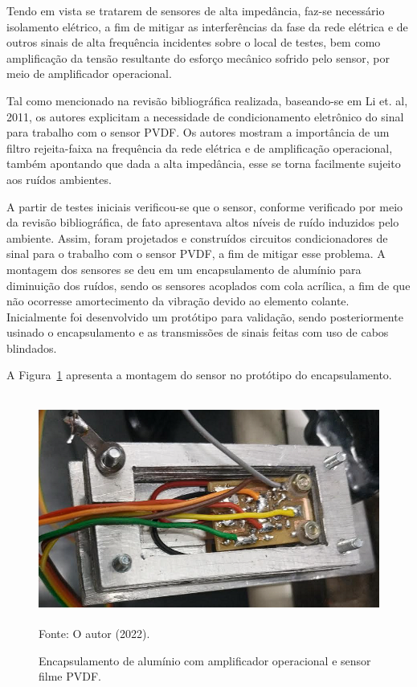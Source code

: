 \documentclass[
	12pt,				
	oneside,			
	a4paper,			
	english,			
	brazil,			
	]{abntex2ppgsi}
\begin{document}
Tendo em vista se tratarem de sensores de alta impedância, faz-se necessário isolamento elétrico, a fim de mitigar as interferências da fase da rede elétrica e de outros sinais de alta frequência incidentes sobre o local de testes, bem como amplificação da tensão resultante do esforço mecânico sofrido pelo sensor, por meio de amplificador operacional. 

Tal como mencionado na revisão bibliográfica realizada, baseando-se em Li et. al, 2011, os autores explicitam a necessidade de condicionamento eletrônico do sinal para trabalho com o sensor PVDF. Os autores mostram a importância de um filtro rejeita-faixa na frequência da rede elétrica e de amplificação operacional, também apontando que dada a alta impedância, esse se torna facilmente sujeito aos ruídos ambientes. 

A partir de testes iniciais verificou-se que o sensor, conforme verificado por meio da revisão bibliográfica, de fato apresentava altos níveis de ruído induzidos pelo ambiente. Assim, foram projetados e construídos circuitos condicionadores de sinal para o trabalho com o sensor PVDF, a fim de mitigar esse problema. A montagem dos sensores se deu em um encapsulamento de alumínio para diminuição dos ruídos, sendo os sensores acoplados com cola acrílica, a fim de que não ocorresse amortecimento da vibração devido ao elemento colante. Inicialmente foi desenvolvido um protótipo para validação, sendo posteriormente usinado o encapsulamento e as transmissões de sinais feitas com uso de cabos blindados. 

A Figura~\ref{encapsulamento_sensor} apresenta a montagem do sensor no protótipo do encapsulamento.

\begin{figure}[H]
\centering
\caption {Encapsulamento de alumínio com amplificador operacional e sensor filme PVDF.}
\includegraphics[width=\textwidth,height=75mm,keepaspectratio]{encapsulamento_sensor} \\
Fonte: O autor (2022).
\label{encapsulamento_sensor}
\end{figure} 
\end{document}
